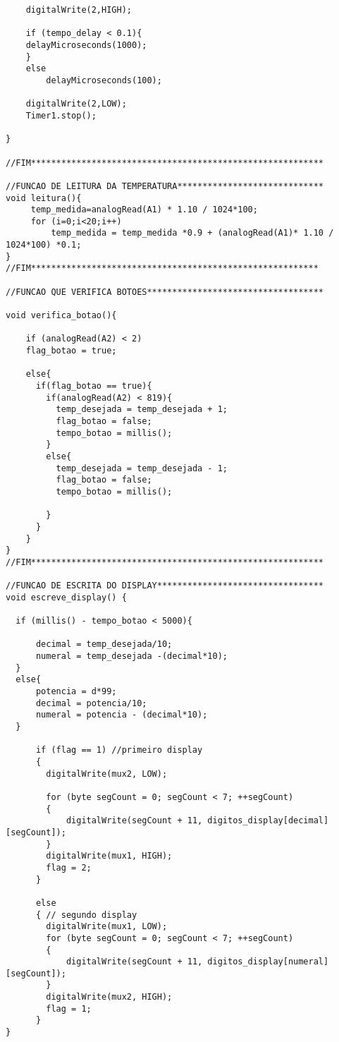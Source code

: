 \begin{lstlisting}
    digitalWrite(2,HIGH);
    
    if (tempo_delay < 0.1){
	delayMicroseconds(1000);
    } 
    else
        delayMicroseconds(100);
    
    digitalWrite(2,LOW);
    Timer1.stop(); 

}

//FIM**********************************************************

//FUNCAO DE LEITURA DA TEMPERATURA*****************************
void leitura(){
     temp_medida=analogRead(A1) * 1.10 / 1024*100; 
     for (i=0;i<20;i++)
         temp_medida = temp_medida *0.9 + (analogRead(A1)* 1.10 / 1024*100) *0.1;
}
//FIM*********************************************************

//FUNCAO QUE VERIFICA BOTOES***********************************

void verifica_botao(){
    
    if (analogRead(A2) < 2) 
	flag_botao = true;
    
    else{
      if(flag_botao == true){
        if(analogRead(A2) < 819){ 
          temp_desejada = temp_desejada + 1;
          flag_botao = false;
          tempo_botao = millis();
        }
        else{ 
          temp_desejada = temp_desejada - 1;
          flag_botao = false;
          tempo_botao = millis();
         
        }
      }
    }
}
//FIM**********************************************************

//FUNCAO DE ESCRITA DO DISPLAY*********************************
void escreve_display() {
  
  if (millis() - tempo_botao < 5000){
  
      decimal = temp_desejada/10;  
      numeral = temp_desejada -(decimal*10);
  }
  else{
      potencia = d*99;
      decimal = potencia/10;
      numeral = potencia - (decimal*10);
  }
   
      if (flag == 1) //primeiro display
      {
        digitalWrite(mux2, LOW);

        for (byte segCount = 0; segCount < 7; ++segCount) 
        {
            digitalWrite(segCount + 11, digitos_display[decimal][segCount]);
        }
        digitalWrite(mux1, HIGH);
        flag = 2;
      }
      
      else 
      { // segundo display
        digitalWrite(mux1, LOW);
        for (byte segCount = 0; segCount < 7; ++segCount) 
        {
            digitalWrite(segCount + 11, digitos_display[numeral][segCount]);
        }
        digitalWrite(mux2, HIGH);
        flag = 1;
      }  
}


\end{lstlisting}
